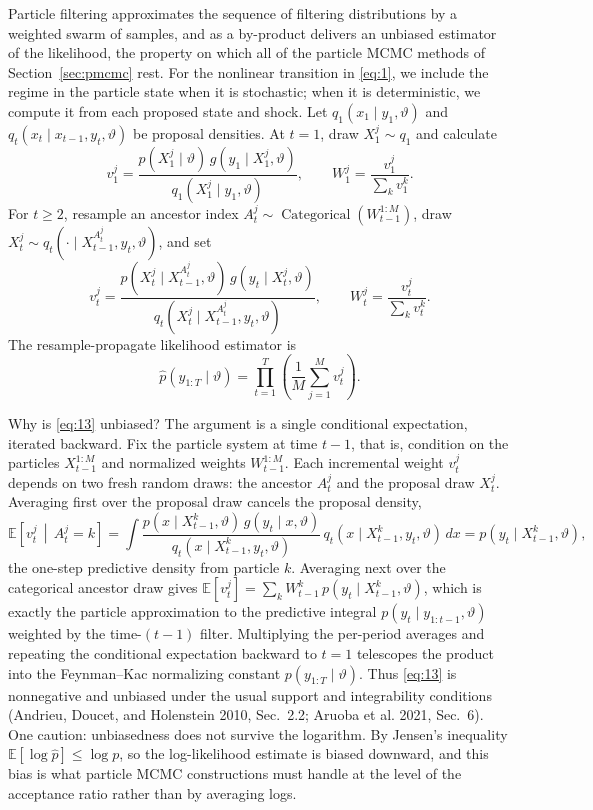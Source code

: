 \documentclass[11pt]{article}
\begin{document}
Particle filtering approximates the sequence of filtering distributions by a
weighted swarm of samples, and as a by-product delivers an unbiased estimator
of the likelihood, the property on which all of the particle MCMC methods
of Section~\ref{sec:pmcmc} rest. For the nonlinear transition in
\eqref{eq:1}, we include the regime in the particle state when it is
stochastic; when it is deterministic, we compute it from each proposed state
and shock. Let $q_1(x_1\mid y_1,\vartheta)$ and
$q_t(x_t\mid x_{t-1},y_t,\vartheta)$ be proposal densities. At $t=1$, draw
$X_1^j\sim q_1$ and calculate
\begin{equation}\label{eq:12a}
 v_1^j=\frac{p(X_1^j\mid\vartheta)\,g(y_1\mid X_1^j,\vartheta)}
 {q_1(X_1^j\mid y_1,\vartheta)},\qquad
 W_1^j=\frac{v_1^j}{\sum_k v_1^k}.
\end{equation}
For $t\geq2$, resample an ancestor index
$A_t^j\sim\operatorname{Categorical}(W_{t-1}^{1:M})$, draw
$X_t^j\sim q_t(\cdot\mid X_{t-1}^{A_t^j},y_t,\vartheta)$, and set
\begin{equation}\label{eq:12b}
 v_t^j=\frac{p(X_t^j\mid X_{t-1}^{A_t^j},\vartheta)\,
                  g(y_t\mid X_t^j,\vartheta)}
 {q_t(X_t^j\mid X_{t-1}^{A_t^j},y_t,\vartheta)},\qquad
 W_t^j=\frac{v_t^j}{\sum_kv_t^k}.
\end{equation}
The resample-propagate likelihood estimator is
\begin{equation}\label{eq:13}
 \widehat p(y_{1:T}\mid\vartheta)=
 \prod_{t=1}^T\left(\frac1M\sum_{j=1}^M v_t^j\right).
\end{equation}

Why is \eqref{eq:13} unbiased? The argument is a single conditional
expectation, iterated backward. Fix the particle system at time $t-1$, that
is, condition on the particles $X_{t-1}^{1:M}$ and normalized weights
$W_{t-1}^{1:M}$. Each incremental weight $v_t^j$ depends on two fresh random
draws: the ancestor $A_t^j$ and the proposal draw $X_t^j$. Averaging first
over the proposal draw cancels the proposal density,
\[
 \mathbb E\!\left[v_t^j \,\middle|\, A_t^j=k\right]
 =\int \frac{p(x\mid X_{t-1}^{k},\vartheta)\,g(y_t\mid x,\vartheta)}
            {q_t(x\mid X_{t-1}^{k},y_t,\vartheta)}\,
       q_t(x\mid X_{t-1}^{k},y_t,\vartheta)\,dx
 =p(y_t\mid X_{t-1}^{k},\vartheta),
\]
the one-step predictive density from particle $k$. Averaging next over the
categorical ancestor draw gives
$\mathbb E[v_t^j]=\sum_k W_{t-1}^k\,p(y_t\mid X_{t-1}^{k},\vartheta)$, which
is exactly the particle approximation to the predictive integral
$p(y_t\mid y_{1:t-1},\vartheta)$ weighted by the time-$(t-1)$ filter.
Multiplying the per-period averages and repeating the conditional expectation
backward to $t=1$ telescopes the product into the Feynman--Kac normalizing
constant $p(y_{1:T}\mid\vartheta)$. Thus \eqref{eq:13} is nonnegative and
unbiased under the usual support and integrability conditions (Andrieu,
Doucet, and Holenstein 2010, Sec.~2.2; Aruoba et al. 2021, Sec.~6). One
caution: unbiasedness does not survive the logarithm. By Jensen's inequality
$\mathbb E[\log\widehat p]\leq\log p$, so the log-likelihood estimate is
biased downward, and this bias is what particle MCMC constructions must
handle at the level of the acceptance ratio rather than by averaging logs.
\end{document}
